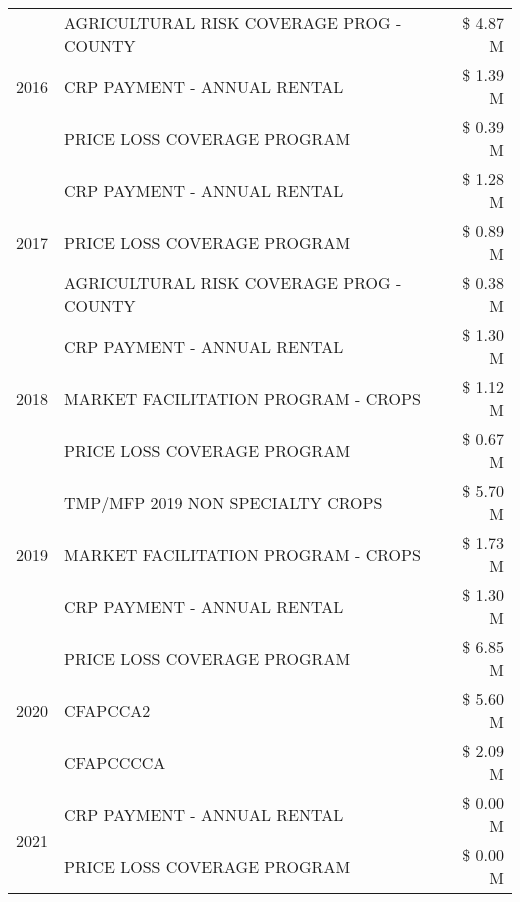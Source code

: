 \begin{tabular}{llr}
\multirow[t]{3}{*}{2016} & AGRICULTURAL RISK COVERAGE PROG - COUNTY & \$ 4.87 M \\
 & CRP PAYMENT - ANNUAL RENTAL & \$ 1.39 M \\
 & PRICE LOSS COVERAGE PROGRAM & \$ 0.39 M \\
\cline{1-3}
\multirow[t]{3}{*}{2017} & CRP PAYMENT - ANNUAL RENTAL & \$ 1.28 M \\
 & PRICE LOSS COVERAGE PROGRAM & \$ 0.89 M \\
 & AGRICULTURAL RISK COVERAGE PROG - COUNTY & \$ 0.38 M \\
\cline{1-3}
\multirow[t]{3}{*}{2018} & CRP PAYMENT - ANNUAL RENTAL & \$ 1.30 M \\
 & MARKET FACILITATION PROGRAM - CROPS & \$ 1.12 M \\
 & PRICE LOSS COVERAGE PROGRAM & \$ 0.67 M \\
\cline{1-3}
\multirow[t]{3}{*}{2019} & TMP/MFP 2019 NON SPECIALTY CROPS & \$ 5.70 M \\
 & MARKET FACILITATION PROGRAM - CROPS & \$ 1.73 M \\
 & CRP PAYMENT - ANNUAL RENTAL & \$ 1.30 M \\
\cline{1-3}
\multirow[t]{3}{*}{2020} & PRICE LOSS COVERAGE PROGRAM & \$ 6.85 M \\
 & CFAPCCA2 & \$ 5.60 M \\
 & CFAPCCCCA & \$ 2.09 M \\
\cline{1-3}
\multirow[t]{2}{*}{2021} & CRP PAYMENT - ANNUAL RENTAL & \$ 0.00 M \\
 & PRICE LOSS COVERAGE PROGRAM & \$ 0.00 M \\
\cline{1-3}
\bottomrule
\end{tabular}
